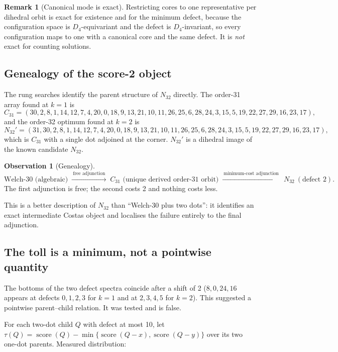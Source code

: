 \documentclass[11pt,a4paper]{article}
\theoremstyle{definition}
\newtheorem{remark}[theorem]{Remark}
\newtheorem{observation}[theorem]{Observation}
\newcommand{\score}{\operatorname{score}}
\begin{document}
\begin{remark}[Canonical mode is exact]
Restricting cores to one representative per dihedral orbit is exact for
existence and for the minimum defect, because the configuration space is
$D_4$-equivariant and the defect is $D_4$-invariant, so every configuration maps
to one with a canonical core and the same defect. It is \emph{not} exact for
counting solutions.
\end{remark}

\subsection{Genealogy of the score-2 object}
\label{sec:genealogy}

The rung searches identify the parent structure of $N_{32}$ directly. The
order-31 array found at $k=1$ is
\[
C_{31} = (30,2,8,1,14,12,7,4,20,0,18,9,13,21,10,11,26,25,6,28,24,3,15,5,19,22,27,29,16,23,17),
\]
and the order-32 optimum found at $k=2$ is
\[
N_{32}' = (31,30,2,8,1,14,12,7,4,20,0,18,9,13,21,10,11,26,25,6,28,24,3,15,5,19,22,27,29,16,23,17),
\]
which is $C_{31}$ with a single dot adjoined at the corner. $N_{32}'$ is a
dihedral image of the known candidate $N_{32}$.

\begin{observation}[Genealogy]
\label{obs:genealogy}
\[
\text{Welch-30 (algebraic)}
\;\xrightarrow{\ \text{free adjunction}\ }\;
C_{31} \text{ (unique derived order-31 orbit)}
\;\xrightarrow{\ \text{minimum-cost adjunction}\ }\;
N_{32}\ (\text{defect }2).
\]
The first adjunction is free; the second costs 2 and nothing costs less.
\end{observation}

This is a better description of $N_{32}$ than ``Welch-30 plus two dots'': it
identifies an exact intermediate Costas object and localises the failure
entirely to the final adjunction.

\subsection{The toll is a minimum, not a pointwise quantity}
\label{sec:toll}

The bottoms of the two defect spectra coincide after a shift of 2
($8,0,24,16$ appears at defects $0,1,2,3$ for $k=1$ and at $2,3,4,5$ for
$k=2$). This suggested a pointwise parent--child relation. It was tested and is
false.

For each two-dot child $Q$ with defect at most 10, let
$\tau(Q)=\score(Q)-\min\{\score(Q-x),\score(Q-y)\}$ over its two one-dot
parents. Measured distribution:
\end{document}

